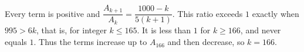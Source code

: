 Every term is positive and $\dfrac{A_{k+1}}{A_k}=\dfrac{1000-k}{5(k+1)}$. This ratio exceeds $1$ exactly when $995>6k$, that is, for integer $k\le 165$. It is less than $1$ for $k\ge 166$, and never equals $1$. Thus the terms increase up to $A_{166}$ and then decrease, so $\boxed{k=166}$.
